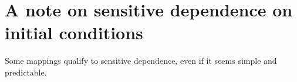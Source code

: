 \documentclass[11pt]{book}
\begin{document}
\section{A note on sensitive dependence on initial conditions}
Some mappings qualify to sensitive dependence, even if it seems simple and predictable.
 


\end{document}
